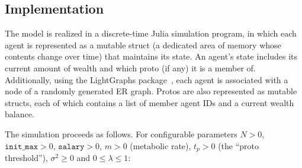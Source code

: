 \documentclass[sigconf]{acmart}
\begin{document}
\subsection{Implementation}

The model is realized in a discrete-time Julia simulation program, in which each agent is represented as a mutable struct (a dedicated area of memory whose contents change over time) that maintains its state. An agent's state includes its current amount of wealth and which proto (if any) it is a member of. Additionally, using the LightGraphs package~\cite{LightGraphs-2017}, each agent is associated with a node of a randomly generated ER graph. Protos are also represented as mutable structs, each of which contains a list of member agent IDs and a current wealth balance.

The simulation proceeds as follows. For configurable parameters
$N > 0$,
$\texttt{init\_max} > 0$,
$\texttt{salary} > 0$,
$m > 0$ (metabolic rate),
$t_p > 0$ (the ``proto threshold''),
$\sigma^2 \ge 0$ and
$0 \le \lambda \le 1$:
\end{document}
